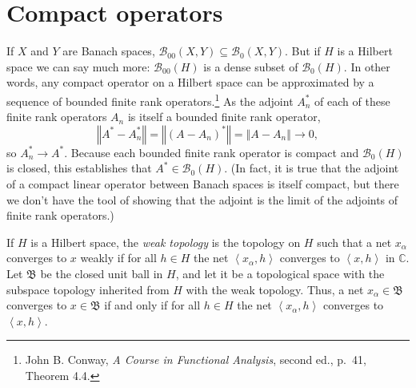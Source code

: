 \documentclass{article}
\newcommand{\inner}[2]{\left\langle #1, #2 \right\rangle}
\newcommand{\norm}[1]{\left\Vert #1 \right\Vert}
\theoremstyle{definition}
\begin{document}
\section{Compact operators}
If $X$ and $Y$ are Banach spaces, $\mathscr{B}_{00}(X,Y) \subseteq \mathscr{B}_0(X,Y)$. But if $H$ is a Hilbert space we can say much more:
$\mathscr{B}_{00}(H)$ is a dense subset of  $\mathscr{B}_0(H)$. In other words, any compact operator on a Hilbert space can be approximated by
a sequence of bounded finite rank operators.\footnote{John B. Conway, {\em A Course in Functional Analysis}, second ed., p.~41, 
Theorem 4.4.} As the adjoint $A_n^*$ of each of these finite rank operators $A_n$  is itself a bounded finite rank operator,
\[
\norm{A^*-A_n^*} =  \norm{(A-A_n)^*} = \norm{A-A_n} \to 0,
\]
so $A_n^* \to A^*$. Because each bounded finite rank operator is compact and $\mathscr{B}_0(H)$ is closed,
this establishes that  $A^* \in \mathscr{B}_0(H)$. (In fact, it is true that the adjoint of a compact linear operator
between Banach spaces is itself compact, but there we don't have the tool of showing that the adjoint is the limit of the adjoints  of finite rank operators.)

If $H$ is a Hilbert space, the {\em weak topology} is the topology on $H$ such that a net $x_\alpha$ converges to $x$ weakly if for all $h \in H$ the net $\inner{x_\alpha}{h}$
converges to $\inner{x}{h}$ in $\mathbb{C}$. Let $\mathfrak{B}$ be the closed unit ball in $H$, and let it be a topological space with the subspace topology inherited from $H$ with the weak
topology. Thus, a net $x_\alpha \in \mathfrak{B}$ converges to $x \in \mathfrak{B}$ if and only if for all $h \in H$ the net $\inner{x_\alpha}{h}$ converges to $\inner{x}{h}$.
\end{document}
